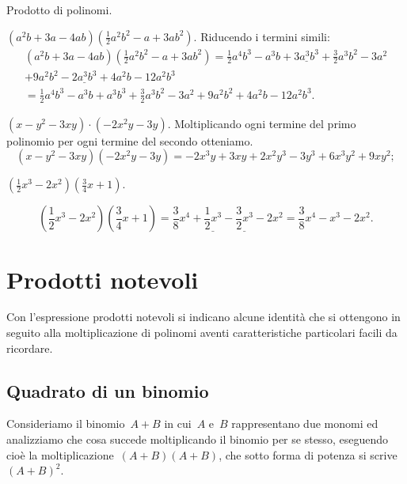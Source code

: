 \begin{exrig}
 \begin{esempio}
 Prodotto di polinomi.

 \begin{enumeratea}
   \item 
\(\left(a^{2}b+3a-4{ab}\right)\left(\frac{1}{2}a^{2}b^{2}-a+3{ab}^{2}
\right).\) Riducendo i termini simili:
 \begin{multline*}
\left(a^{2}b+3a-4{ab}\right)\left(\frac{1}{2}a^{2}b^{2}-a+3{ab}^{2}\right)=%
\frac{1}{2}a^{4}b^{3}-a^{3}b+\underline{3a^{3}b^{3}}+\frac{3}{2}a^{3}b^{2}
-3a^{2}\\
   +9a^{2}b^{2} -\underline{2a^{3}b^{3}}+4a^{2}b-12a^{2}b^{3}\\
=\frac{1}{2}a^{4}b^{3}-a^{3}b+a^{3}b^{3}+\frac{3}{2}a^{3}b^{2}-3a^{2}+9a^{2}
b^{2}+4a^{2}b-12a^{2}b^{3}.
 \end{multline*}
 \item  \(\left(x-y^{2}-3{xy}\right)\cdot \left(-2x^{2}y-3y\right).\)
 Moltiplicando ogni termine del primo polinomio per ogni termine del
secondo otteniamo.
\[\left(x-y^{2}-3{xy}\right)\left(-2x^{2}y-3y\right)=-2x^{3}y+3{xy}+2x^{2}y^
{3}-3y^{3}+6x^{3}y^{2}+9{xy}^{2};\]

 \item \(\left(\frac{1}{2}x^{3}-2x^{2}\right)\left(\frac{3}{4}x+1\right)\).
 
\[\left(\frac{1}{2}x^{3}-2x^{2}\right)\left(\frac{3}{4}x+1\right)=\frac{3}{8
}x^{4}+\underline{\frac{1}{2}x^{3}}-\underline{\frac{3}{2}x^{3}}-2x^{2}
=\frac{3}{8}x^{4}-x^{3}-2x^{2}.\]
 \end{enumeratea}
 \end{esempio}
\end{exrig}

\section{Prodotti notevoli}

Con l'espressione prodotti notevoli si indicano alcune
identità che si ottengono in seguito alla moltiplicazione di polinomi
aventi caratteristiche particolari facili da ricordare.

\subsection{Quadrato di un binomio}
\label{subsec:11_prodnot_quadratobinomio}

Consideriamo il binomio~\(A+B\) in cui~\(A\) e~\(B\) rappresentano due monomi ed
analizziamo che cosa succede moltiplicando il binomio per se
stesso, eseguendo cioè la
moltiplicazione~\(\left(A+B\right)\left(A+B\right)\), che sotto forma di 
potenza si scrive~\(\left(A+B\right)^{2}\).

